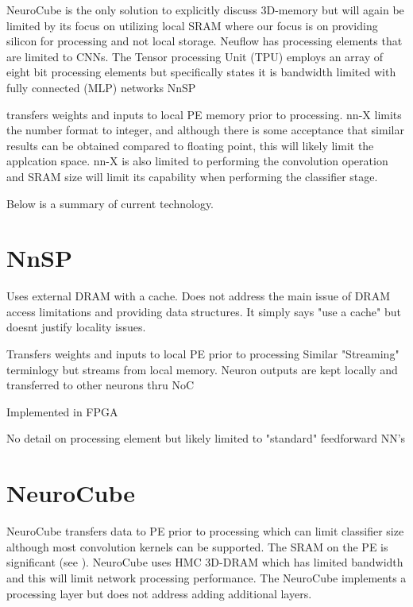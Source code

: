 {{%
\iftrue

\vspace{5mm}
NeuroCube\cite{kim2016neurocube} is the only solution to explicitly discuss 3D-memory but will again be limited by its focus on utilizing local SRAM where our focus is on
providing silicon for processing and not local storage.
Neuflow\cite{farabet2011neuflow} has processing elements that are limited to CNNs.
The Tensor processing Unit (TPU) \cite{jouppi2017datacenter} employs an array of eight bit processing elements but specifically states it is bandwidth limited with fully connected (MLP) networks
NnSP{\cite{esmaeilzadeh2005nnsp} transfers weights and inputs to local PE memory prior to processing.
nn-X\cite{gokhale2014240} limits the number format to integer, and although there is some acceptance that similar
results can be obtained compared to floating point, this will likely limit the applcation space. 
nn-X is also limited to performing the convolution operation and SRAM size will limit its capability when performing the classifier stage.

Below is a summary of current technology.

\section[NnSP]{NnSP{\cite{esmaeilzadeh2005nnsp}}}

Uses external DRAM with a cache.
 Does not address the main issue of DRAM access limitations and providing data structures.
 It simply says "use a cache" but doesnt justify locality issues.

Transfers weights and inputs to local PE prior to processing
Similar "Streaming" terminlogy but streams from local memory.
Neuron outputs are kept locally and transferred to other neurons thru NoC

Implemented in FPGA

No detail on processing element but likely limited to "standard" feedforward NN's


\section[NeuroCube]{NeuroCube{\cite{kim2016neurocube}}}
NeuroCube\cite{kim2016neurocube} transfers data to PE prior to processing which can limit classifier size although most
convolution kernels can be supported.
The SRAM on the PE is significant (see ).
NeuroCube uses HMC 3D-DRAM which has limited bandwidth and this will limit network processing performance.
The NeuroCube implements a processing layer but does not address adding additional layers. 

}}}
